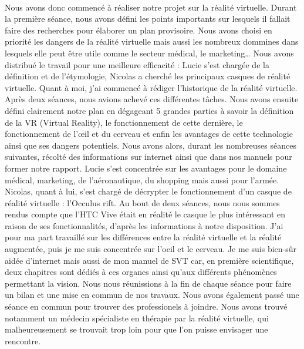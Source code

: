 \documentclass[11pt, a4paper]{article}
\begin{document}
\paragraph*{} Nous avons donc commencé à réaliser notre projet sur la réalité virtuelle. Durant la première séance, nous avons défini les points importants sur lesquels il fallait faire des recherches pour élaborer un plan provisoire. Nous avons choisi en priorité les dangers de la réalité virtuelle mais aussi les nombreux dommines dans lesquels elle peut être utile comme le secteur médical, le marketing\ldots{}
Nous avons distribué le travail pour une meilleure efficacité : Lucie s'est chargée de la définition et de l'étymologie, Nicolas a cherché les principaux casques de réalité virtuelle. Quant à moi, j'ai commencé à rédiger l'historique de la réalité virtuelle. Après deux séances, nous avions achevé ces différentes tâches. Nous avons ensuite défini clairement notre plan en dégageant 5 grandes parties à savoir la définition de la VR (Virtual Reality), le fonctionnement de cette dernière, le fonctionnement de l'\oe{}il et du cerveau et enfin les avantages de cette technologie ainsi que ses dangers potentiels. Nous avons alors, durant les nombreuses séances suivantes, récolté des informations sur internet ainsi que dans nos manuels pour former notre rapport. Lucie s'est concentrée sur les avantages pour le domaine médical, marketing, de l'aéronautique, du shopping mais aussi pour l'armée. Nicolas, quant à lui, s'est chargé de décrypter le fonctionnement d'un casque de réalité virtuelle : l'Occulus rift. Au bout de deux séances, nous nous sommes rendus compte que l'HTC Vive était en réalité le casque le plus intéressant en raison de ses fonctionnalités, d'après les informations à notre disposition. J'ai pour ma part travaillé sur les différences entre la réalité virtuelle et la réalité augmentée, puis je me suis concentrée sur l'oeil et le cerveau. Je me suis bien-sûr aidée d'internet mais aussi de mon manuel de SVT car, en première scientifique, deux chapitres sont dédiés à ces organes ainsi qu'aux différents phénomènes permettant la vision. Nous nous réunissions à la fin de chaque séance pour faire un bilan et une mise en commun de nos travaux. Nous avons également passé une séance en commun pour trouver des professionels à joindre. Nous avons trouvé notamment un médecin spécialiste en thérapie par la réalité virtuelle, qui malheureusement se trouvait trop loin pour que l'on puisse envisager une rencontre.
\end{document}
